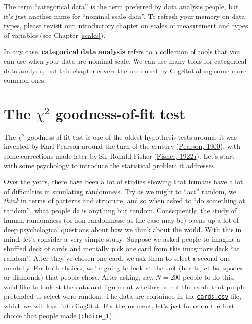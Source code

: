 \documentclass[
]{book}
\theoremstyle{definition}
\theoremstyle{definition}
\theoremstyle{definition}
\theoremstyle{definition}
\theoremstyle{remark}
\begin{document}
The term ``categorical data'' is the term preferred by data analysis people, but it's just another name for ``nominal scale data''. To refresh your memory on data types, please revisit our introductory chapter on scales of measurement and types of variables (see Chapter \ref{scales}).

In any case, \textbf{categorical data analysis} refers to a collection of tools that you can use when your data are nominal scale. We can use many tools for categorical data analysis, but this chapter covers the ones used by CogStat along some more common ones.

\hypertarget{goftest}{%
\section{\texorpdfstring{The \(\chi^2\) goodness-of-fit test}{The \textbackslash chi\^{}2 goodness-of-fit test}}\label{goftest}}

The \(\chi^2\) goodness-of-fit test is one of the oldest hypothesis tests around: it was invented by Karl Pearson around the turn of the century (\protect\hyperlink{ref-Pearson1900}{Pearson, 1900}), with some corrections made later by Sir Ronald Fisher (\protect\hyperlink{ref-Fisher1922}{Fisher, 1922a}). Let's start with some psychology to introduce the statistical problem it addresses.

Over the years, there have been a lot of studies showing that humans have a lot of difficulties in simulating randomness. Try as we might to ``act'' random, we \emph{think} in terms of patterns and structure, and so when asked to ``do something at random'', what people do is anything but random. Consequently, the study of human randomness (or non-randomness, as the case may be) opens up a lot of deep psychological questions about how we think about the world. With this in mind, let's consider a very simple study. Suppose we asked people to imagine a shuffled deck of cards and mentally pick one card from this imaginary deck ``at random''. After they've chosen one card, we ask them to select a second one mentally. For both choices, we're going to look at the suit (hearts, clubs, spades or diamonds) that people chose. After asking, say, \(N=200\) people to do this, we'd like to look at the data and figure out whether or not the cards that people pretended to select were random. The data are contained in the \href{resources/data/cards.csv}{\texttt{cards.csv}} file, which we will load into CogStat. For the moment, let's just focus on the first choice that people made (\texttt{choice\_1}).
\end{document}
